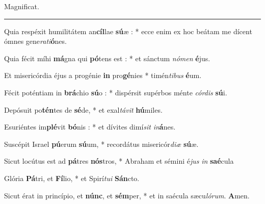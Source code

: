 \documentclass[letterpaper,12pt]{article} %
\renewcommand*\oldstylenums[1]{{\fontfamily{fxlj}\selectfont #1}}
\begin{document}
\begin{center}{\Large Magnificat.}\end{center}


\def\greinitialformat#1{%
{\fontsize{38}{38}\selectfont #1}%
}


{
\setsecondannotation{\small \oldstylenums{ \textbf{Ant. 1. a3}}}


\large {}}%
\hrule
{}

{\large
{}
\begin{list}{.}{\setlength\itemsep{0pt}\setlength\parsep{2pt}\setlength{}\setlength\leftmargin{0pt}\setlength\itemindent{6ex}}
\setcounter{vcounter}{2}
\item Quia respéxit humilitátem an{\bf cíl}lae {\bf sú}æ : * ecce enim ex hoc beátam me dícent ómnes gene{\it ra}{\it ti}{\bf ó}nes.
\item Quia fécit míhi {\bf má}gna qui {\bf pó}tens est : * et sánctum {\it nó}{\it men} {\bf é}jus.
\item Et misericórdia éjus a progénie {\bf in} pro{\bf gé}nies * timén{\it ti}{\it bus} {\bf é}um.
\item Fécit poténtiam in {\bf brá}chio {\bf sú}o : * dispérsit supérbos ménte {\it cór}{\it dis} {\bf sú}i.
\item Depósuit po{\bf tén}tes de {\bf sé}de, * et exal{\it tá}{\it vit} {\bf hú}miles.
\item Esuriéntes im{\bf plé}vit {\bf bó}nis : * et dívites dimí{\it sit} {\it in}{\bf á}nes.
\item Suscépit Israel {\bf pú}erum {\bf sú}um, * recordátus misericór{\it di}{\it æ} {\bf sú}æ.
\item Sicut locútus est ad {\bf pá}tres {\bf nós}tros, * Abraham et sémini é{\it jus} {\it in} {\bf saé}cula
\item Glória {\bf Pá}tri, et {\bf Fí}lio, * et Spirí{\it tu}{\it i} {\bf Sán}cto.
\item Sicut érat in princípio, et {\bf núnc}, et {\bf sém}per, * et in saécula sæcu{\it ló}{\it rum}. {\bf A}men.
\end{list}
}
\end{document}
